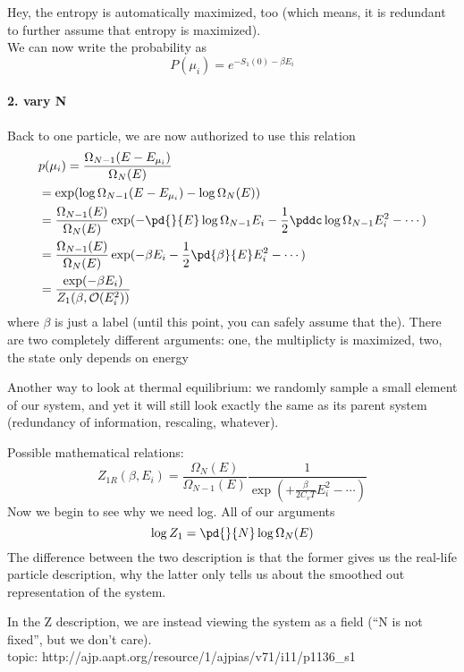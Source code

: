         Hey, the entropy is automatically maximized, too (which means, it is redundant to further assume that entropy is maximized).\\
        We can now write the probability as
        \[ P(\mu_i) = e^{-S_1(0) -\beta E_i} \]

        \paragraph{2. vary N}
        




        Back to one particle, we are now authorized to use this relation
        \begin{align*}
            &p(\mu_i) = \frac{\Omega_{N -1}(E-E_{\mu_i})}{\Omega_N(E)} \\
            &= \exp(\log\Omega_{N-1}(E-E_{\mu_i}) - \log \Omega_N(E))\\
            & = \frac{\Omega_{N-1}( E )}{\Omega_N(E)} \exp(-\pd{}{E}\log \Omega_{N-1}E_i - \frac{1}{2}\pddc \log\Omega_{N-1}E_i^2 - \cdots  )\\
            & = \frac{\Omega_{N-1}( E )}{\Omega_N(E)} \exp(-\beta E_i -\frac12 \pd{\beta}{E} E_i^2 - \cdots  )\\
            & = \frac{\exp(-\beta E_i)}{Z_1(\beta,\mathcal{O}(E_i^2))}\\ 
        \end{align*}
        where $\beta$ is just a label (until this point, you can safely assume that the). There are two completely different arguments: one, the multiplicty is maximized, two, the state only depends on energy

        Another way to look at thermal equilibrium: we randomly sample a small element of our system, and yet it will still look exactly the same as its parent system (redundancy of information, rescaling, whatever).

        Possible mathematical relations:
        \[Z_{1R}(\beta,E_i)  = \frac{\Omega_N(E)}{ \Omega_{N-1}(E)}\frac1{\exp(+ \frac{\beta}{2C_v T}E_i^2 - \cdots  )}\]
            Now we begin to see why we need log. All of our arguments
            \[\log Z_1 = \pd{}{N}\log \Omega_N(E)\]
        The difference between the two description is that the former gives us the real-life particle description, why the latter only tells us about the smoothed out representation of the system.

        In the Z description, we are instead viewing the system as a field (``N is not fixed'', but we don't care).\\
        topic: http://ajp.aapt.org/resource/1/ajpias/v71/i11/p1136_s1

        


